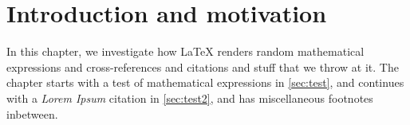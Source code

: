 \chapter{Introduction and motivation}\label{ch:test}\noindent
In this chapter, we investigate how LaTeX renders random mathematical expressions and cross-references and citations and stuff that we throw at it.
The chapter starts with a test of mathematical expressions in \cref{sec:test}, and continues with a \emph{Lorem Ipsum} citation in \cref{sec:test2}, and has miscellaneous footnotes inbetween.



